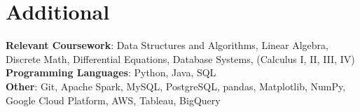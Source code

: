 \documentclass[letterpaper,11pt]{article}
\begin{document}
\section{Additional}
 \begin{itemize}[leftmargin=0.15in, label={}]
    \small{\item{
     {\textbf{Relevant Coursework}}{: Data Structures and Algorithms, Linear Algebra, Discrete Math, Differential Equations, Database Systems, (Calculus I, II, III, IV)}\\
     \textbf{Programming Languages}{: Python, Java, SQL} \\
     \textbf{Other}{: Git, Apache Spark, MySQL, PostgreSQL, pandas, Matplotlib, NumPy, Google Cloud Platform, AWS, Tableau, BigQuery} \\
    }}
 \end{itemize}


\end{document}
